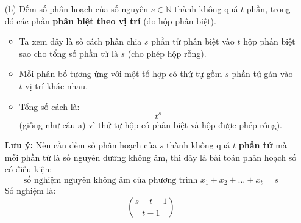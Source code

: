 \documentclass{article}
\begin{document}
	\begin{enumerate}
		\item[(b)] 
		Đếm số phân hoạch của số nguyên $s \in \mathbb{N}$ thành không quá $t$ phần, trong đó các phần \textbf{phân biệt theo vị trí} (do hộp phân biệt).
		
		\begin{itemize}
			\item Ta xem đây là số cách phân chia $s$ phần tử phân biệt vào $t$ hộp phân biệt sao cho tổng số phần tử là $s$ (cho phép hộp rỗng).
			\item Mỗi phân bố tương ứng với một tổ hợp có thứ tự gồm $s$ phần tử gán vào $t$ vị trí khác nhau.
			\item Tổng số cách là:
			\[
			\boxed{t^s}
			\]
			(giống như câu a) vì thứ tự hộp có phân biệt và hộp được phép rỗng).
		\end{itemize}
		
		\textbf{Lưu ý:} Nếu cần đếm số phân hoạch của $s$ thành không quá $t$ \textbf{phần tử} mà mỗi phần tử là số nguyên dương không âm, thì đây là bài toán phân hoạch số có điều kiện:
		\[
		\text{số nghiệm nguyên không âm của phương trình } x_1 + x_2 + \dots + x_t = s
		\]
		Số nghiệm là:
		\[
		\boxed{\binom{s + t - 1}{t - 1}}
		\]
	\end{enumerate}
\end{document}
